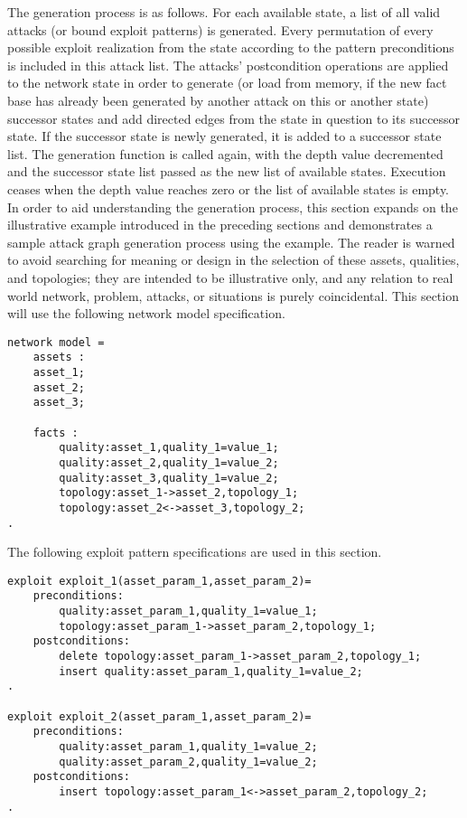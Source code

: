 The generation process is as follows. For each available state, a list of all valid 
attacks (or bound exploit patterns) is generated. 
Every permutation of every possible exploit realization from the state according to
the pattern preconditions is included in this attack list. The attacks' postcondition
operations are applied to the network state in order to generate (or load from memory, if
the new fact base has already been generated by another attack on this or another state)
successor states and add directed edges from the state in question to its successor state.
If the successor state is newly generated, it is added to a successor state list.
The generation function is called again, with the depth value decremented and the successor
state list passed as the new list of available states. Execution ceases when the depth
value reaches zero or the list of available states is empty.
In order to aid understanding the generation process, this section expands on the
illustrative example introduced in the preceding sections and demonstrates a
sample attack graph generation process using the example. The reader is warned to
avoid searching for meaning or design in the selection of these assets, qualities,
and topologies; they are intended to be illustrative only, and any relation to 
real world network, problem, attacks, or situations is purely coincidental.
This section will use the following network model specification.
\begin{lstlisting}
network model = 
    assets :
    asset_1;
    asset_2;
    asset_3;

    facts :
        quality:asset_1,quality_1=value_1;
        quality:asset_2,quality_1=value_2;        
        quality:asset_3,quality_1=value_2;
        topology:asset_1->asset_2,topology_1;
        topology:asset_2<->asset_3,topology_2;
.
\end{lstlisting}

The following exploit pattern specifications are used in this section.
\begin{lstlisting}
exploit exploit_1(asset_param_1,asset_param_2)=
    preconditions:
        quality:asset_param_1,quality_1=value_1;
        topology:asset_param_1->asset_param_2,topology_1;
    postconditions:
        delete topology:asset_param_1->asset_param_2,topology_1;
        insert quality:asset_param_1,quality_1=value_2;
.

exploit exploit_2(asset_param_1,asset_param_2)=
    preconditions:
        quality:asset_param_1,quality_1=value_2;
        quality:asset_param_2,quality_1=value_2;
    postconditions:
        insert topology:asset_param_1<->asset_param_2,topology_2;
.
\end{lstlisting}

